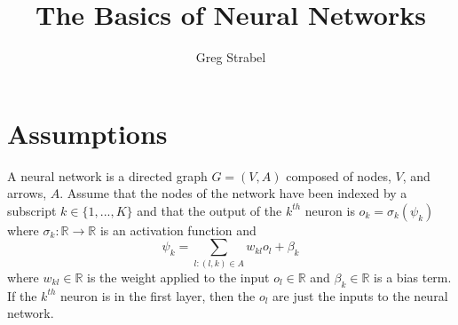\documentclass[11pt]{article}
\author{Greg Strabel}
\title{The Basics of Neural Networks}
\begin{document}
\maketitle
\section{Assumptions}
A neural network is a directed graph $G = \left( V,A \right)$ composed of nodes, $V$, and arrows, $A$. Assume that the nodes of the network have been indexed by a subscript $k \in \{ 1,...,K \}$ and that the output of the $k^{th}$ neuron is $o_{k} = \sigma_{k} \left( \psi_{k} \right)$ where $\sigma_{k} : \mathbb{R} \rightarrow \mathbb{R}$ is an activation function and
\begin{equation} \label{eq1}
\psi _{k} = \sum_{l : \left( l, k \right) \in A} w_{kl} o_{l} + \beta_k
\end{equation}
where $w_{kl} \in \mathbb{R}$ is the weight applied to the input $o_{l} \in \mathbb{R}$ and $\beta_k \in \mathbb{R}$ is a bias term. If the $k^{th}$ neuron is in the first layer, then the $o_{l}$ are just the inputs to the neural network.
\end{document}
